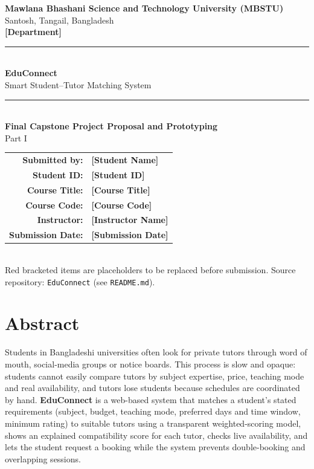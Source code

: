 \documentclass[11pt,a4paper]{article}
\newcommand{\ph}[1]{\textcolor{placeholder}{\textbf{[#1]}}}
\newcommand{\studentname}{\ph{Student Name}}
\newcommand{\studentid}{\ph{Student ID}}
\newcommand{\coursetitle}{\ph{Course Title}}
\newcommand{\coursecode}{\ph{Course Code}}
\newcommand{\instructor}{\ph{Instructor Name}}
\newcommand{\department}{\ph{Department}}
\newcommand{\submissiondate}{\ph{Submission Date}}
\begin{document}
\begin{titlepage}
\centering
\vspace*{0.6cm}
{\large\bfseries Mawlana Bhashani Science and Technology University (MBSTU)}\\[0.2cm]
{\normalsize Santosh, Tangail, Bangladesh}\\[0.2cm]
{\normalsize \department}\\[1.6cm]
{\color{edublue}\rule{\linewidth}{1.2pt}}\\[0.5cm]
{\Huge\bfseries\color{edublue} EduConnect}\\[0.3cm]
{\Large Smart Student--Tutor Matching System}\\[0.5cm]
{\color{edublue}\rule{\linewidth}{1.2pt}}\\[1.2cm]
{\Large\bfseries Final Capstone Project Proposal and Prototyping}\\[0.2cm]
{\large Part I}\\[1.8cm]
\begin{tabular}{@{}rl@{}}
\textbf{Submitted by:} & \studentname \\
\textbf{Student ID:} & \studentid \\
\textbf{Course Title:} & \coursetitle \\
\textbf{Course Code:} & \coursecode \\
\textbf{Instructor:} & \instructor \\
\textbf{Submission Date:} & \submissiondate \\
\end{tabular}\\[2cm]
{\small Red bracketed items are placeholders to be replaced before submission.}
\vfill
{\small Source repository: \texttt{EduConnect} (see \texttt{README.md}).}
\end{titlepage}

\section*{Abstract}
Students in Bangladeshi universities often look for private tutors through word of mouth, social-media groups or notice boards. This process is slow and opaque: students cannot easily compare tutors by subject expertise, price, teaching mode and real availability, and tutors lose students because schedules are coordinated by hand. \textbf{EduConnect} is a web-based system that matches a student's stated requirements (subject, budget, teaching mode, preferred days and time window, minimum rating) to suitable tutors using a transparent weighted-scoring model, shows an explained compatibility score for each tutor, checks live availability, and lets the student request a booking while the system prevents double-booking and overlapping sessions.
\end{document}
